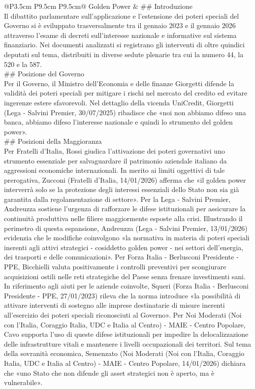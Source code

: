 \documentclass[a4paper,11pt]{article}
\begin{document}
\begin{landscape}
\begin{longtable}{@{}P{3.5cm} P{9.5cm} P{9.5cm}@{}}
\midrule
Golden Power & \#\# Introduzione\\[6pt] Il dibattito parlamentare sull'applicazione e l'estensione dei poteri speciali del Governo si è sviluppato trasversalmente tra il gennaio 2023 e il gennaio 2026 attraverso l'esame di decreti sull'interesse nazionale e informative sul sistema finanziario. Nei documenti analizzati si registrano gli interventi di oltre quindici deputati sul tema, distribuiti in diverse sedute plenarie tra cui la numero 44, la 520 e la 587.\\[6pt] \#\# Posizione del Governo\\[6pt] Per il Governo, il Ministro dell'Economia e delle finanze Giorgetti difende la validità dei poteri speciali per mitigare i rischi nel mercato del credito ed evitare ingerenze estere sfavorevoli. Nel dettaglio della vicenda UniCredit, Giorgetti (Lega - Salvini Premier, 30/07/2025) ribadisce che «noi non abbiamo difeso una banca, abbiamo difeso l'interesse nazionale e quindi lo strumento del golden power».\\[6pt] \#\# Posizioni della Maggioranza\\[6pt] Per Fratelli d'Italia, Rossi giudica l'attivazione dei poteri governativi uno strumento essenziale per salvaguardare il patrimonio aziendale italiano da aggressioni economiche internazionali. In merito ai limiti oggettivi di tale prerogativa, Zucconi (Fratelli d'Italia, 14/01/2026) afferma che «il golden power interverrà solo se la protezione degli interessi essenziali dello Stato non sia già garantita dalla regolamentazione di settore». Per la Lega - Salvini Premier, Andreuzza sostiene l'urgenza di rafforzare le difese istituzionali per assicurare la continuità produttiva nelle filiere maggiormente esposte alla crisi. Illustrando il perimetro di questa espansione, Andreuzza (Lega - Salvini Premier, 13/01/2026) evidenzia che le modifiche coinvolgono «la normativa in materia di poteri speciali inerenti agli attivi strategici - cosiddetto golden power - nei settori dell'energia, dei trasporti e delle comunicazioni». Per Forza Italia - Berlusconi Presidente - PPE, Bicchielli valuta positivamente i controlli preventivi per scongiurare acquisizioni ostili nelle reti strategiche del Paese senza frenare investimenti sani. In riferimento agli aiuti per le aziende coinvolte, Squeri (Forza Italia - Berlusconi Presidente - PPE, 27/01/2023) rileva che la norma introduce «la possibilità di attivare interventi di sostegno alle imprese destinatarie di misure inerenti all'esercizio dei poteri speciali riconosciuti al Governo». Per Noi Moderati (Noi con l'Italia, Coraggio Italia, UDC e Italia al Centro) - MAIE - Centro Popolare, Cavo supporta l'uso di queste difese istituzionali per impedire la delocalizzazione delle infrastrutture vitali e mantenere i livelli occupazionali dei territori. Sul tema della sovranità economica, Semenzato (Noi Moderati (Noi con l'Italia, Coraggio Italia, UDC e Italia al Centro) - MAIE - Centro Popolare, 14/01/2026) dichiara che «uno Stato che non difende gli asset strategici non è aperto, ma è vulnerabile». 
\end{longtable}
\end{landscape}
\end{document}
